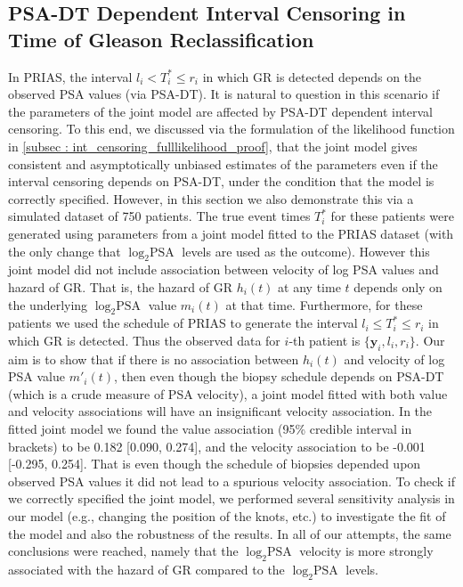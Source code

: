 \clearpage
\subsection{PSA-DT Dependent Interval Censoring in Time of Gleason Reclassification}
In PRIAS, the interval $l_i < T_i^* \leq r_i$ in which GR is detected depends on the observed PSA values (via PSA-DT). It is natural to question in this scenario if the parameters of the joint model are affected by PSA-DT dependent interval censoring. To this end, we discussed via the formulation of the likelihood function in \ref{subsec : int_censoring_fulllikelihood_proof}, that the joint model gives consistent and asymptotically unbiased estimates of the parameters even if the interval censoring depends on PSA-DT, under the condition that the model is correctly specified. However, in this section we also demonstrate this via a simulated dataset of 750 patients. The true event times $T^*_i$ for these patients were generated using parameters from a joint model fitted to the PRIAS dataset (with the only change that $\log_2 \mbox{PSA}$ levels are used as the outcome). However this joint model did not include association between velocity of log PSA values and hazard of GR. That is, the hazard of GR $h_i(t)$ at any time $t$ depends only on the underlying $\log_2 \mbox{PSA}$ value $m_i(t)$ at that time. Furthermore, for these patients we used the schedule of PRIAS to generate the interval $l_i \leq T^*_i \leq r_i$ in which GR is detected. Thus the observed data for $i$-th patient is $\{\boldsymbol{y}_i, l_i, r_i\}$. Our aim is to show that if there is no association between $h_i(t)$ and velocity of log PSA value $m'_i(t)$, then even though the biopsy schedule depends on PSA-DT (which is a crude measure of PSA velocity), a joint model fitted with both value and velocity associations will have an insignificant velocity association. In the fitted joint model we found the value association (95\% credible interval in brackets) to be 0.182 [0.090, 0.274], and the velocity association to be -0.001 [-0.295, 0.254]. That is even though the schedule of biopsies depended upon observed PSA values it did not lead to a spurious velocity association. To check if we correctly specified the joint model, we performed several sensitivity analysis in our model (e.g., changing the position of the knots, etc.) to investigate the fit of the model and also the robustness of the results. In all of our attempts, the same conclusions were reached, namely that the $\log_2 \mbox{PSA}$ velocity is more strongly associated with the hazard of GR compared to the $\log_2 \mbox{PSA}$ levels.